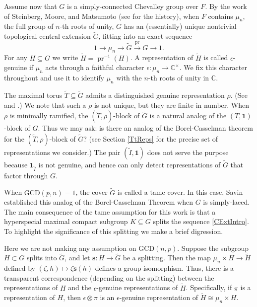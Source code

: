 \documentclass[10pt, letterpaper]{amsart}
\theoremstyle{plain}
\theoremstyle{definition}
\numberwithin{equation}{section}
\newcommand{\pr}{\operatorname{pr}}
\newcommand{\Gt}{\widetilde{G}}
\newcommand{\Ht}{\widetilde{H}}
\newcommand{\It}{\widetilde{I}}
\newcommand{\Tt}{\widetilde{T}}
\newcommand{\s}{\mathbf{s}}
\newcommand{\one}{\mathbf{1}}
\begin{document}
Assume now that $G$ is a simply-connected Chevalley group over $F$. By the work of Steinberg, Moore, and Matsumoto (see \cite{GGW18} for the history), when $F$ contains $\mu_{n}$, the full group of $n$-th roots of unity, $G$ has an (essentially) unique nontrivial topological central extension $\Gt$, fitting into an exact sequence
\begin{equation}\label{CExtIntro}
    1\longrightarrow\mu_n\longrightarrow\Gt\stackrel{\pr}{\longrightarrow} G\longrightarrow 1.
\end{equation}
For any $H\subseteq G$ we write $\Ht=\pr^{-1}(H)$. A representation of $\Ht$ is called $\epsilon$-genuine if $\mu_{n}$ acts through a faithful character $\epsilon:\mu_{n}\rightarrow \mathbb{C}^{\times}$. We fix this character throughout and use it to identify $\mu_{n}$ with the $n$-th roots of unity in $\mathbb{C}$.

The maximal torus $\Tt\subseteq \Gt$ admits a distinguished genuine representation $\rho$. (See \cite{S04} and \cite[Section 6, Theorems 6.6, 6.8]{GG18}.) We note that such a $\rho$ is not unique, but they are finite in number. When $\rho$ is minimally ramified, the $(\Tt,\rho)$-block of $\Gt$ is a natural analog of the $(T,\one)$-block of $G$. Thus we may ask: is there an analog of the Borel-Casselman theorem for the $(\Tt,\rho)$-block of $\Gt$? (see Section \ref{TtReps} for the precise set of representations we consider.) The pair $(\It, \one)$ does not serve the purpose because $\one_{\It}$ is not genuine, and hence can only detect representations of $\Gt$ that factor through $G$. 

When $\mathrm{GCD}(p,n)=1$, the cover $\Gt$ is called a tame cover. In this case, Savin \cite{S04} established this analog of the Borel-Casselman Theorem when $G$ is simply-laced. The main consequence of the tame assumption for this work is that a hyperspecial maximal compact subgroup $K\subseteq G$ splits the sequence \eqref{CExtIntro}. To highlight the significance of this splitting we make a brief digression. 

Here we are not making any assumption on $\mathrm{GCD}(n,p)$. Suppose the subgroup $H\subset G$ splits into $\Gt$, and let $\s :H\rightarrow \Gt$ be a splitting. Then the map $\mu_{n}\times H\rightarrow \Ht$ defined by $(\zeta,h)\mapsto \zeta\s(h)$ defines a group isomorphism. Thus, there is a transparent correspondence (depending on the splitting) between the representations of $H$ and the $\epsilon$-genuine representations of $\Ht$. Specifically, if $\pi$ is a representation of $H$, then $\epsilon\otimes \pi$ is an $\epsilon$-genuine representation of $\Ht\cong \mu_{n}\times H$.
\end{document}
